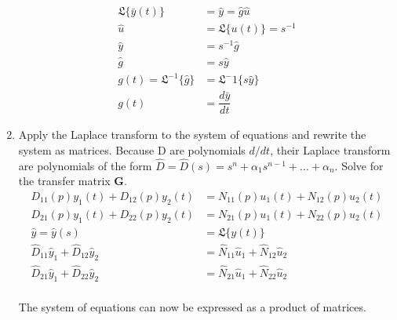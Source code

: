 \documentclass[a4paper,12pt]{article}
\begin{document}
\begin{enumerate}
\begin{align*}
 \mathfrak{L}\{\bar y(t)\} &= \hat y = \hat g \hat u \\
 \hat u &= \mathfrak{L} \{u(t)\} = s^{-1}\\
\hat y &= s^{-1} \hat g \\
\hat g &= s \hat y\\
g (t) = \mathfrak{L}^{-1} \{\hat g \} &= \mathfrak{L}^-1 \{s \hat y \}\\
g(t) &= \dfrac{d \bar y}{dt}
\end{align*}

\item Apply the Laplace transform to the system of equations and rewrite the system as matrices.
Because D are polynomials $d/dt$, their Laplace transform are polynomials of the form $\hat D = \hat D(s) = s^n + \alpha_1 s^{n-1} + \dots + \alpha_n$.
Solve for the transfer matrix $\mathbf G$.
\begin{align*}
D_{11}(p) y_1(t) + D_{12}(p)y_2(t) &= N_{11}(p) u_1(t) + N_{12}(p) u_2(t)\\
D_{21}(p) y_1(t) + D_{22}(p)y_2(t) &= N_{21}(p) u_1(t) + N_{22}(p) u_2(t)\\
\hat y = \hat y (s) &= \mathfrak{L}\{y (t)\}\\
\hat D_{11} \hat y_1 + \hat D_{12} \hat y_2 &= \hat N_{11} \hat u_1 + \hat N_{12} \hat u_2 \\
\hat D_{21} \hat y_1 + \hat D_{22} \hat y_2 &= \hat N_{21} \hat u_1 + \hat N_{22} \hat u_2 \\
\end{align*}

The system of equations can now be expressed as a product of matrices.


\end{enumerate}
\end{document}
